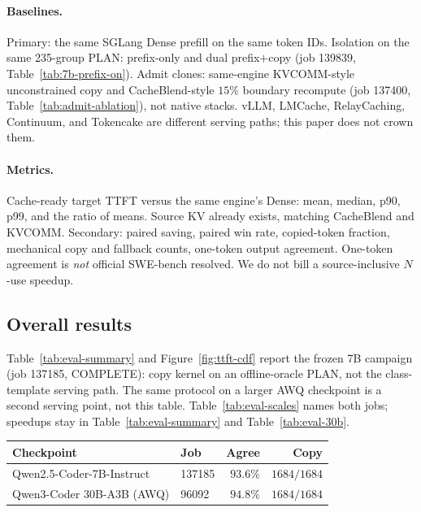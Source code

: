 \paragraph{Baselines.}
Primary: the same SGLang Dense prefill on the same token IDs.
Isolation on the same 235-group PLAN: prefix-only and dual
prefix$+$copy (job 139839, Table~\ref{tab:7b-prefix-on}). Admit clones:
same-engine KVCOMM-style unconstrained copy and CacheBlend-style
$15\%$ boundary recompute (job 137400, Table~\ref{tab:admit-ablation}),
not native stacks. vLLM, LMCache, RelayCaching, Continuum, and Tokencake
are different serving paths; this paper does not crown them.

\paragraph{Metrics.}
Cache-ready target TTFT versus the same engine's Dense: mean, median,
p90, p99, and the ratio of means. Source KV already exists, matching
CacheBlend and KVCOMM. Secondary: paired saving, paired win rate,
copied-token fraction, mechanical copy and fallback counts, one-token
output agreement. One-token agreement is \emph{not} official SWE-bench
resolved. We do not bill a source-inclusive $N$-use speedup.

\subsection{Overall results}

Table~\ref{tab:eval-summary} and Figure~\ref{fig:ttft-cdf}
report the frozen 7B campaign (job 137185, COMPLETE): copy kernel on
an offline-oracle PLAN, not the class-template serving path. The same
protocol on a larger AWQ checkpoint is a second serving point, not this
table.
Table~\ref{tab:eval-scales} names both jobs; speedups stay in
Table~\ref{tab:eval-summary} and Table~\ref{tab:eval-30b}.

\begin{center}
\small
{}
\label{tab:eval-scales}
\begin{tabular}{llrr}
\toprule
\textbf{Checkpoint} & \textbf{Job} & \textbf{Agree} & \textbf{Copy} \\
\midrule
Qwen2.5-Coder-7B-Instruct & 137185 & $93.6\%$ & $1684/1684$ \\
Qwen3-Coder 30B-A3B (AWQ) & 96092 & $94.8\%$ & $1684/1684$ \\
\bottomrule
\end{tabular}
\end{center}

